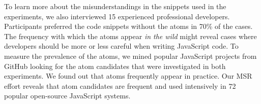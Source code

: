 To learn more about the misunderstandings in the snippets used in the experiments, we also interviewed 15 experienced professional developers. Participants preferred the code snippets without the atoms in 70\% of the cases. The frequency with which the atoms appear \emph{in the wild} might reveal cases where developers should be more or less careful when writing JavaScript code. To measure the prevalence of the atoms, we mined popular JavaScript projects from GitHub looking for the atom candidates that were investigated in both experiments. We found out that atoms frequently appear in practice. 
Our MSR effort reveals that atom candidates are frequent and used intensively in 72 popular open-source JavaScript systems.



